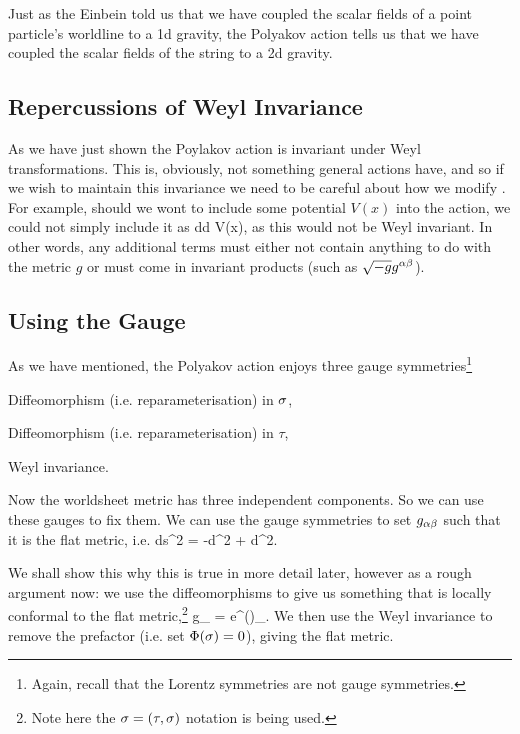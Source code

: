 \br 
Just as the Einbein told us that we have coupled the scalar fields of a point particle's worldline to a 1d gravity, the Polyakov action tells us that we have coupled the scalar fields of the string to a 2d gravity. 
\er 

\subsection{Repercussions of Weyl Invariance}

As we have just shown the Poylakov action is invariant under Weyl transformations. This is, obviously, not something general actions have, and so if we wish to maintain this invariance we need to be careful about how we modify . For example, should we wont to include some potential $V(x)$ into the action, we could not simply include it as 
\bse 
    \int d\sig d\tau {} V(x),
\ese 
as this would not be Weyl invariant. In other words, any additional terms must either not contain anything to do with the metric $g$ or must come in invariant products (such as $\sqrt{-g}g^{\alpha\beta}$). 

\subsection{Using the Gauge}

As we have mentioned, the Polyakov action enjoys three gauge symmetries\footnote{Again, recall that the Lorentz symmetries are not gauge symmetries.}
\ben 
    \item Diffeomorphism (i.e. reparameterisation) in $\sigma$,
    \item Diffeomorphism (i.e. reparameterisation) in $\tau$,
    \item Weyl invariance. 
\een 

Now the worldsheet metric has three independent components. So we can use these gauges to fix them. 
\bcl
We can use the gauge symmetries to set $g_{\alpha\beta}$ such that it is the flat metric, i.e. 
\be
\label{eqn:FlatMetricPolyakov}
    ds^2 = -d\tau^2 + d\sig^2.
\ee
\ecl 

We shall show this why this is true in more detail later, however as a rough argument now: we use the diffeomorphisms to give us something that is locally conformal to the flat metric,\footnote{Note here the $\sigma=(\tau,\sigma)$ notation is being used.} 
\bse 
    g_{\a\beta} = e^{\Phi(\sig)}\eta_{\a\beta}. 
\ese 
We then use the Weyl invariance to remove the prefactor (i.e. set $\Phi(\sigma)=0$), giving the flat metric. 

